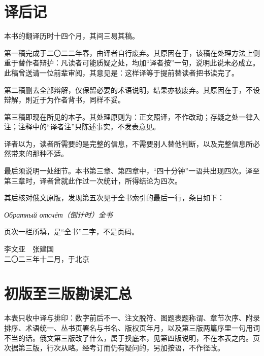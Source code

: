 \chapter*{译\quad 后\quad 记}

本书的翻译历时十四个月，其间三易其稿。

第一稿完成于二〇二二年春，由译者自行废弃。其原因在于，该稿在处理方法上侧重于替作者辩护：凡读者可能质疑之处，均加“译者按”一句，说明此说未必成立。此稿曾送请一位前辈审阅，其意见是：这样译等于提前替读者把书读完了\nobreak。

第二稿删去全部辩解，仅保留必要的术语说明，结果亦被废弃。其原因在于，不设辩解，則近于为作者背书，同样不妥。

第三稿即现在所见的本子。其处理原则为：正文照译，不作改动；存疑之处一律入注；注释中的“译者注”只陈述事实，不发表意见。

译者以为，读者所需要的是完整的信息，不需要别人替他判断，以及完整信息所必然带来的那种不适。

最后须说明一处细节。本书第三章、第四章中，“四十分钟”一语共出现四次。译至第三章时，译者曾就此作过一次统计，所得结论为四次。

其后核对俄文原版，发现第五次见于全书索引的最后一行，条目如下：

\vspace{2mm}
\begin{center}
{\small\itshape Обратный отсчёт（倒计时）\dotfill 全书}
\end{center}
\vspace{2mm}

页次一栏所填，是“全书”二字，不是页码。

\vspace{8mm}
\begin{flushright}
{\small 李文亚\ \ 张建国}\\[2pt]
{\footnotesize\color{pencil} 二〇二三年十二月，于北京}
\end{flushright}

\clearpage
\chapter*{初版至三版勘误汇总}

本表只收中译与排印：数字前后不一、注文脱符、图题表题称谓、章节次序、附录排序、术语统一、丛书页署名与书名、版权页年月，以及第三版两篇序里一句用词不当的话。俄文第三版改了什么，属于换底本，见第四版说明，不在本表之内。页次据第三版，行次从略。经考订而仍有疑问的，另加按语，不作径改。

